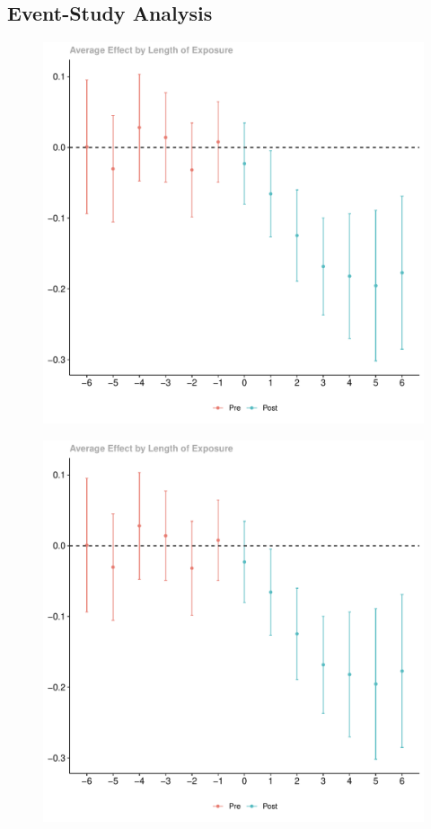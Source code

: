 \documentclass[10pt, oneside]{article}
\begin{document}
\subsection{Event-Study Analysis}
\begin{figure}[htbp]
    \centering
    \includegraphics[page = 1, width=\textwidth]{Rplots.pdf}
    \label{fig:rplots}
  \end{figure}

  \begin{figure}[htbp]
    \centering
    \includegraphics[page = 2, width=\textwidth]{Rplots.pdf}
    \label{fig:rplots}
  \end{figure}
\break
\end{document}
